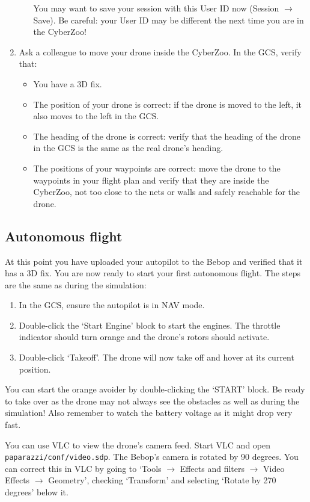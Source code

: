 \documentclass{article}
\begin{document}
\begin{enumerate}
\begin{enumerate}
You may want to save your session with this User ID now (Session $\rightarrow$ Save). Be careful: your User ID may be different the next time you are in the CyberZoo!
\end{enumerate}
\item Ask a colleague to move your drone inside the CyberZoo. In the GCS, verify that:
\begin{itemize}
\item You have a 3D fix.
\item The position of your drone is correct: if the drone is moved to the left, it also moves to the left in the GCS.
\item The heading of the drone is correct: verify that the heading of the drone in the GCS is the same as the real drone's heading.
\item The positions of your waypoints are correct: move the drone to the waypoints in your flight plan and verify that they are inside the CyberZoo, not too close to the nets or walls and safely reachable for the drone.
\end{itemize}
\end{enumerate}



\subsection*{Autonomous flight}
At this point you have uploaded your autopilot to the Bebop and verified that it has a 3D fix.
You are now ready to start your first autonomous flight.
The steps are the same as during the simulation:
\begin{enumerate}
\item In the GCS, ensure the autopilot is in NAV mode.
\item Double-click the `Start Engine' block to start the engines. The throttle indicator should turn orange and the drone's rotors should activate.
\item Double-click `Takeoff'. The drone will now take off and hover at its current position.
\end{enumerate}
You can start the orange avoider by double-clicking the `START' block. Be ready to take over as the drone may not always see the obstacles as well as during the simulation! Also remember to watch the battery voltage as it might drop very fast.

\medskip
You can use VLC to view the drone's camera feed. Start VLC and open \verb"paparazzi/conf/video.sdp".
The Bebop's camera is rotated by 90 degrees. You can correct this in VLC by going to `Tools $\rightarrow$ Effects and filters $\rightarrow$ Video Effects $\rightarrow$ Geometry', checking `Transform' and selecting `Rotate by 270 degrees' below it.
\end{document}
